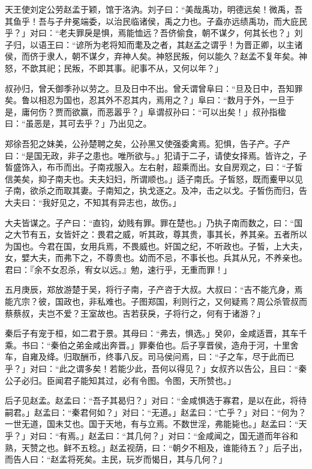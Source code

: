 \documentclass[]{article}
\begin{document}
天王使刘定公劳赵孟于颖，馆于洛汭。刘子曰：``美哉禹功，明德远矣！微禹，吾其鱼乎！吾与子弁冕端委，以治民临诸侯，禹之力也。子盍亦远绩禹功，而大庇民乎？」对曰：``老夫罪戾是惧，焉能恤远？吾侪偷食，朝不谋夕，何其长也？」刘子归，以语王曰：``谚所为老将知而耄及之者，其赵孟之谓乎！为晋正卿，以主诸侯，而侪于隶人，朝不谋夕，弃神人矣。神怒民叛，何以能久？赵孟不复年矣。神怒，不歆其祀；民叛，不即其事。祀事不从，又何以年？」

叔孙归，曾夭御季孙以劳之。旦及日中不出。曾夭谓曾阜曰：``旦及日中，吾知罪矣。鲁以相忍为国也，忍其外不忍其内，焉用之？」阜曰：``数月于外，一旦于是，庸何伤？贾而欲赢，而恶嚣乎？」阜谓叔孙曰：``可以出矣！」叔孙指楹曰：``虽恶是，其可去乎？」乃出见之。

郑徐吾犯之妹美，公孙楚聘之矣，公孙黑又使强委禽焉。犯惧，告子产。子产曰：``是国无政，非子之患也。唯所欲与。」犯请于二子，请使女择焉。皆许之，子皙盛饰入，布币而出。子南戎服入。左右射，超乘而出。女自房观之，曰：``子皙信美矣，抑子南夫也。夫夫妇妇，所谓顺也。」适子南氏。子皙怒，既而櫜甲以见子南，欲杀之而取其妻。子南知之，执戈逐之。及冲，击之以戈。子皙伤而归，告大夫曰：``我好见之，不知其有异志也，故伤。」

大夫皆谋之。子产曰：``直钧，幼贱有罪。罪在楚也。」乃执子南而数之，曰：``国之大节有五，女皆奸之：畏君之威，听其政，尊其贵，事其长，养其亲。五者所以为国也。今君在国，女用兵焉，不畏威也。奸国之纪，不听政也。子皙，上大夫，女，嬖大夫，而弗下之，不尊贵也。幼而不忌，不事长也。兵其从兄，不养亲也。君曰：『余不女忍杀，宥女以远。』勉，速行乎，无重而罪！」

五月庚辰，郑放游楚于吴，将行子南，子产咨于大叔。大叔曰：``吉不能亢身，焉能亢宗？彼，国政也，非私难也。子图郑国，利则行之，又何疑焉？周公杀管叔而蔡蔡叔，夫岂不爱？王室故也。吉若获戾，子将行之，何有于诸游？」

秦后子有宠于桓，如二君于景。其母曰：``弗去，惧选。」癸卯，金咸适晋，其车千乘。书曰：``秦伯之弟金咸出奔晋。」罪秦伯也。后子享晋侯，造舟于河，十里舍车，自雍及绛。归取酬币，终事八反。司马侯问焉，曰：``子之车，尽于此而已乎？」对曰：``此之谓多矣！若能少此，吾何以得见？」女叔齐以告公，且曰：``秦公子必归。臣闻君子能知其过，必有令图。令图，天所赞也。」

后子见赵孟。赵孟曰：``吾子其曷归？」对曰：``金咸惧选于寡君，是以在此，将待嗣君。」赵孟曰：``秦君何如？」对曰：``无道。」赵孟曰：``亡乎？」对曰：``何为？一世无道，国未艾也。国于天地，有与立焉。不数世淫，弗能毙也。」赵孟曰：``天乎？」对曰：``有焉。」赵孟曰：``其几何？」对曰：``金咸闻之，国无道而年谷和熟，天赞之也。鲜不五稔。」赵孟视荫，曰：``朝夕不相及，谁能待五？」后子出，而告人曰：``赵孟将死矣。主民，玩岁而愒日，其与几何？」
\end{document}
